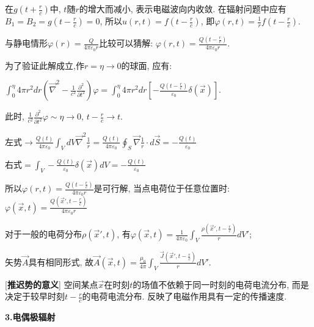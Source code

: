 \qquad 在$g(t+\frac{r}{c})$中, $t$随$r$的增大而减小, 表示电磁波向内收敛. 在辐射问题中应有$B_1=B_2=g(t-\frac{r}{c})=0$, 所以$u(r,t)=f(t-\frac{r}{c})$, 即$\varphi(r,t)=\frac{1}{r}f(t-\frac{r}{c})$.\par
\qquad 与静电情形$\varphi(r)=\frac{Q}{4\pi\varepsilon_0r}$比较可以猜解: $\varphi(r,t)=\frac{Q(t-\frac{r}{c})}{4\pi\varepsilon_0r}$.\par
\qquad \quad 为了验证此解成立,作$r=\eta\to 0$的球面, 应有: \par 
\qquad \qquad $\int_0^\eta 4\pi r^2dr\left(\vec\nabla^2-\frac{1}{c^2}\frac{\partial^2}{\partial t^2}\right)\varphi=\int_0^\eta 4\pi r^2dr\left[-\frac{Q(t-\frac{r}{c})}{\varepsilon_0}\delta(\vec x)\right]$.\par
\qquad \qquad \qquad 此时, $\frac{1}{c^2}\frac{\partial^2}{\partial t^2}\varphi \sim \eta\to 0$, $t-\frac{r}{c}\to t$.\par
\qquad \qquad \qquad 左式$\to \frac{Q(t)}{4\pi\varepsilon_0}\int_VdV\vec\nabla^2\frac{1}{r}=\frac{Q(t)}{4\pi\varepsilon_0}\oint_S\vec\nabla\frac{1}{r}\cdot d\vec S=-\frac{Q(t)}{\varepsilon_0}$\par
\qquad \qquad \qquad 右式$=\int_V-\frac{Q(t)}{\varepsilon_0}\delta(\vec x)dV=-\frac{Q(t)}{\varepsilon_0}$\par
\qquad \quad 所以$\varphi(r,t)=\frac{Q(t-\frac{r}{c})}{4\pi\varepsilon_0r}$是可行解, 当点电荷位于任意位置时: $\varphi(\vec x,t)=\frac{Q(\vec x',t-\frac{r}{c})}{4\pi\varepsilon_0r}$\par
\qquad 对于一般的电荷分布$\rho(\vec x',t)$, 有$\varphi(\vec x,t)=\frac{1}{4\pi\varepsilon_0}\int_V\frac{\rho(\vec x', t-\frac{r}{c})}{r}dV'$;\par
\qquad 矢势$\vec A$具有相同形式, 故$\vec A(\vec x,t)=\frac{\mu_0}{4\pi}\int_V\frac{\vec J(\vec x',t-\frac{r}{c})}{r}dV'$.\par

[\textbf{推迟势的意义}] 空间某点$\vec x$在时刻$t$的场值不依赖于同一时刻的电荷电流分布, 而是决定于较早时刻$t-\frac{r}{c}$的电荷电流分布. 反映了电磁作用具有一定的传播速度.\par

\clearpage

\begin{center}
 \textbf{3.电偶极辐射}
\end{center}

